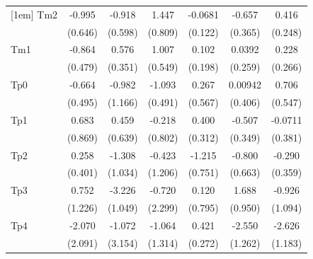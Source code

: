 \begin{longtable}{l*{6}{c}}
[1em]
Tm2                 &      -0.995         &      -0.918         &       1.447\sym{*}  &     -0.0681         &      -0.657\sym{*}  &       0.416\sym{*}  \\
                    &     (0.646)         &     (0.598)         &     (0.809)         &     (0.122)         &     (0.365)         &     (0.248)         \\
[1em]
Tm1                 &      -0.864\sym{*}  &       0.576         &       1.007\sym{*}  &       0.102         &      0.0392         &       0.228         \\
                    &     (0.479)         &     (0.351)         &     (0.549)         &     (0.198)         &     (0.259)         &     (0.266)         \\
[1em]
Tp0                 &      -0.664         &      -0.982         &      -1.093\sym{**} &       0.267         &     0.00942         &       0.706         \\
                    &     (0.495)         &     (1.166)         &     (0.491)         &     (0.567)         &     (0.406)         &     (0.547)         \\
[1em]
Tp1                 &       0.683         &       0.459         &      -0.218         &       0.400         &      -0.507         &     -0.0711         \\
                    &     (0.869)         &     (0.639)         &     (0.802)         &     (0.312)         &     (0.349)         &     (0.381)         \\
[1em]
Tp2                 &       0.258         &      -1.308         &      -0.423         &      -1.215         &      -0.800         &      -0.290         \\
                    &     (0.401)         &     (1.034)         &     (1.206)         &     (0.751)         &     (0.663)         &     (0.359)         \\
[1em]
Tp3                 &       0.752         &      -3.226\sym{***}&      -0.720         &       0.120         &       1.688\sym{*}  &      -0.926         \\
                    &     (1.226)         &     (1.049)         &     (2.299)         &     (0.795)         &     (0.950)         &     (1.094)         \\
[1em]
Tp4                 &      -2.070         &      -1.072         &      -1.064         &       0.421         &      -2.550\sym{**} &      -2.626\sym{**} \\
                    &     (2.091)         &     (3.154)         &     (1.314)         &     (0.272)         &     (1.262)         &     (1.183)         \\

\end{longtable}

